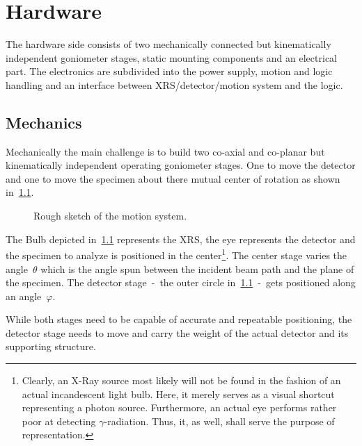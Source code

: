 \chapter{Hardware}
    The hardware side consists of two mechanically connected but kinematically independent goniometer stages, static mounting components and an electrical part.
    The electronics are subdivided into the power supply, motion and logic handling and an interface between XRS/detector/motion system and the logic.

    \section{Mechanics}
        Mechanically the main challenge is to build two co-axial and co-planar but kinematically independent operating goniometer stages.
        One to move the detector and one to move the specimen about there mutual center of rotation as shown in~\cref{fig:rough sketch of the motion system}.
        \begin{figure}[h]
            \centering
            \label{fig:rough sketch of the motion system}
            \caption[Rough sketch of the motion system.]{Rough sketch of the motion system.}
        \end{figure}
        The Bulb depicted in~\cref{fig:rough sketch of the motion system} represents the XRS, the eye represents the detector and the specimen to analyze is positioned in the center\footnote{Clearly, an X-Ray source most likely will not be found in the fashion of an actual incandescent light bulb. Here, it merely serves as a visual shortcut representing a photon source. Furthermore, an actual eye performs rather poor at detecting \(\gamma\)-radiation. Thus, it, as well, shall serve the purpose of representation.}.
        The center stage varies the angle~\(\theta\) which is the angle spun between the incident beam path and the plane of the specimen.
        The detector stage~-~the outer circle in~\cref{fig:rough sketch of the motion system}~-~gets positioned along an angle~\(\varphi\).\par\medskip

        While both stages need to be capable of accurate and repeatable positioning, the detector stage needs to move and carry the weight of the actual detector and its supporting structure.
        

